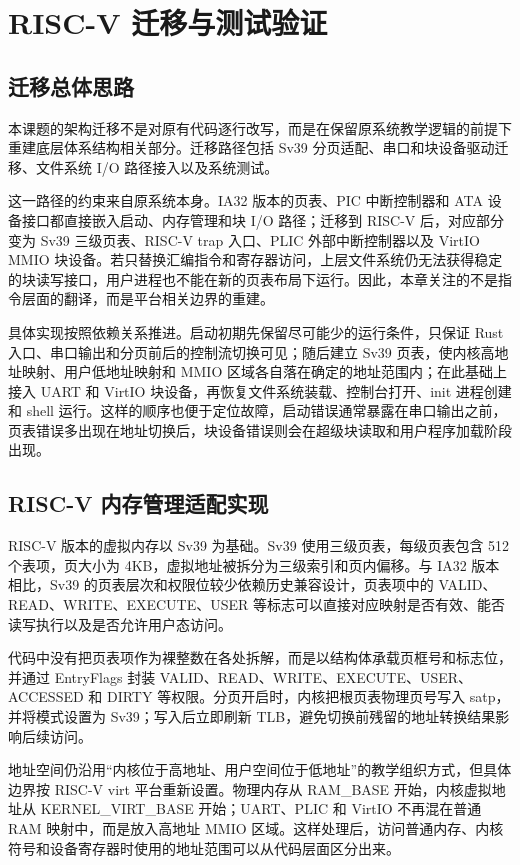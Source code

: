 \chapter{RISC-V 迁移与测试验证}

\section{迁移总体思路}

本课题的架构迁移不是对原有代码逐行改写，而是在保留原系统教学逻辑的前提下重建底层体系结构相关部分。迁移路径包括 Sv39 分页适配、串口和块设备驱动迁移、文件系统 I/O 路径接入以及系统测试。

这一路径的约束来自原系统本身。IA32 版本的页表、PIC 中断控制器和 ATA 设备接口都直接嵌入启动、内存管理和块 I/O 路径；迁移到 RISC-V 后，对应部分变为 Sv39 三级页表、RISC-V trap 入口、PLIC 外部中断控制器以及 VirtIO MMIO 块设备。若只替换汇编指令和寄存器访问，上层文件系统仍无法获得稳定的块读写接口，用户进程也不能在新的页表布局下运行。因此，本章关注的不是指令层面的翻译，而是平台相关边界的重建。

具体实现按照依赖关系推进。启动初期先保留尽可能少的运行条件，只保证 Rust 入口、串口输出和分页前后的控制流切换可见；随后建立 Sv39 页表，使内核高地址映射、用户低地址映射和 MMIO 区域各自落在确定的地址范围内；在此基础上接入 UART 和 VirtIO 块设备，再恢复文件系统装载、控制台打开、init 进程创建和 shell 运行。这样的顺序也便于定位故障，启动错误通常暴露在串口输出之前，页表错误多出现在地址切换后，块设备错误则会在超级块读取和用户程序加载阶段出现。

\section{RISC-V 内存管理适配实现}

RISC-V 版本的虚拟内存以 Sv39 为基础。Sv39 使用三级页表，每级页表包含 512 个表项，页大小为 4KB，虚拟地址被拆分为三级索引和页内偏移。与 IA32 版本相比，Sv39 的页表层次和权限位较少依赖历史兼容设计，页表项中的 VALID、READ、WRITE、EXECUTE、USER 等标志可以直接对应映射是否有效、能否读写执行以及是否允许用户态访问。

代码中没有把页表项作为裸整数在各处拆解，而是以结构体承载页框号和标志位，并通过 EntryFlags 封装 VALID、READ、WRITE、EXECUTE、USER、ACCESSED 和 DIRTY 等权限。分页开启时，内核把根页表物理页号写入 satp，并将模式设置为 Sv39；写入后立即刷新 TLB，避免切换前残留的地址转换结果影响后续访问。

地址空间仍沿用“内核位于高地址、用户空间位于低地址”的教学组织方式，但具体边界按 RISC-V virt 平台重新设置。物理内存从 RAM\_BASE 开始，内核虚拟地址从 KERNEL\_VIRT\_BASE 开始；UART、PLIC 和 VirtIO 不再混在普通 RAM 映射中，而是放入高地址 MMIO 区域。这样处理后，访问普通内存、内核符号和设备寄存器时使用的地址范围可以从代码层面区分出来。

